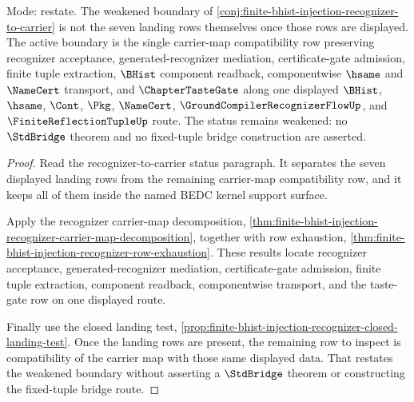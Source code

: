 \begin{theorem}
\label{thm:finite-bhist-injection-carrier-map-status-refinement}
Mode: restate. The weakened boundary of \autoref{conj:finite-bhist-injection-recognizer-to-carrier} is not the seven landing rows themselves once those rows are displayed. The active boundary is the single carrier-map compatibility row preserving recognizer acceptance, generated-recognizer mediation, certificate-gate admission, finite tuple extraction, $\BHist$ component readback, componentwise $\hsame$ and $\NameCert$ transport, and $\ChapterTasteGate$ along one displayed $\BHist$, $\hsame$, $\Cont$, $\Pkg$, $\NameCert$, $\GroundCompilerRecognizerFlowUp$, and $\FiniteReflectionTupleUp$ route. The status remains weakened: no $\StdBridge$ theorem and no fixed-tuple bridge construction are asserted.
\end{theorem}
\begin{proof}
Read the recognizer-to-carrier status paragraph. It separates the seven displayed landing rows from the remaining carrier-map compatibility row, and it keeps all of them inside the named BEDC kernel support surface.

Apply the recognizer carrier-map decomposition, \autoref{thm:finite-bhist-injection-recognizer-carrier-map-decomposition}, together with row exhaustion, \autoref{thm:finite-bhist-injection-recognizer-row-exhaustion}. These results locate recognizer acceptance, generated-recognizer mediation, certificate-gate admission, finite tuple extraction, component readback, componentwise transport, and the taste-gate row on one displayed route.

Finally use the closed landing test, \autoref{prop:finite-bhist-injection-recognizer-closed-landing-test}. Once the landing rows are present, the remaining row to inspect is compatibility of the carrier map with those same displayed data. That restates the weakened boundary without asserting a $\StdBridge$ theorem or constructing the fixed-tuple bridge route.
\end{proof}

